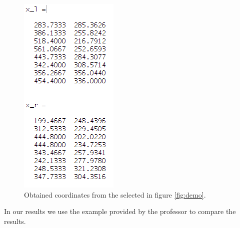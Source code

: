 \documentclass[a4paper,12pt]{article}
\begin{document}
\begin{figure}[h]
    \centering
    \includegraphics[totalheight=.24\textheight]{./images/ExamplePts.png}
    \caption{Obtained coordinates from the selected in figure \ref{fig:demo}.}
    \label{fig:pts}
\end{figure}

In our results we use the example provided by the professor to compare the results. \\
\end{document}
